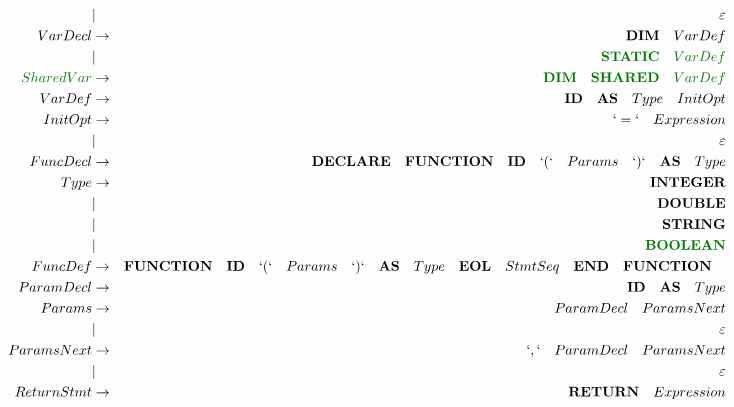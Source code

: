 \documentclass[a4paper,11pt,landscape,leqno]{article}
\begin{document}
\begin{eqnarray}
			&		|			& \varepsilon \\
VarDecl		& \rightarrow		& \textbf{DIM}\quad VarDef \\
			&		|			& \textcolor{green1}{\textbf{STATIC}\quad VarDef} \\
\textcolor{green1}{SharedVar}&		 \rightarrow		   & \textcolor{green1}{\textbf{DIM}\quad \textbf{SHARED}\quad VarDef} \\
VarDef		& \rightarrow		& \textbf{ID}\quad \textbf{AS}\quad Type \quad InitOpt\\
InitOpt		&	   \rightarrow	& `=`\quad Expression \\
			&		|			& \varepsilon \\
FuncDecl	&  \rightarrow		& \textbf{DECLARE}\quad \textbf{FUNCTION}\quad \textbf{ID}\quad `(` \quad Params \quad`)`\quad \textbf{AS}\quad Type   \\
Type		&	 \rightarrow	&	 \textbf{INTEGER}	 \\
			&		|			& \textbf{DOUBLE}	\\
			&		|			& \textbf{STRING}	\\
			&		|			& \textcolor{green1}{\textbf{BOOLEAN}}	\\
	FuncDef    &	\rightarrow    & \textbf{FUNCTION}\quad \textbf{ID}\quad `(`\quad Params\quad `)`\quad \textbf{AS}\quad Type\quad \textbf{EOL}\quad StmtSeq\quad \textbf{END}\quad \textbf{FUNCTION}\quad \\
ParamDecl	&	\rightarrow   & {\textbf{ID}\quad \textbf{AS}\quad Type}	\\
Params		&	 \rightarrow	& {ParamDecl}\quad ParamsNext  \\
			&	 |				& \varepsilon			  \\
ParamsNext	&	 \rightarrow	& `,`\quad {ParamDecl}\quad  ParamsNext   \\
			&	 |				& \varepsilon			  \\
ReturnStmt	&	\rightarrow		& \textbf{RETURN}\quad Expression	  \\

\end{eqnarray}
\end{document}
